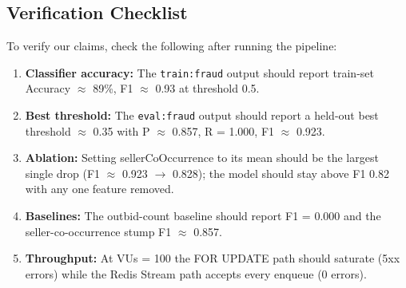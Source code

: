 \documentclass[11pt]{article}
\begin{document}
\subsection{Verification Checklist}

To verify our claims, check the following after running the pipeline:

\begin{enumerate}
    \item \textbf{Classifier accuracy:} The \texttt{train:fraud} output
      should report train-set Accuracy $\approx$ 89\%, F1 $\approx$ 0.93
      at threshold 0.5.
    \item \textbf{Best threshold:} The \texttt{eval:fraud} output should
      report a held-out best threshold $\approx$ 0.35 with P $\approx$
      0.857, R = 1.000, F1 $\approx$ 0.923.
    \item \textbf{Ablation:} Setting sellerCoOccurrence to its mean should
      be the largest single drop (F1 $\approx$ 0.923 $\to$ 0.828); the
      model should stay above F1 0.82 with any one feature removed.
    \item \textbf{Baselines:} The outbid-count baseline should report
      F1 = 0.000 and the seller-co-occurrence stump F1 $\approx$ 0.857.
    \item \textbf{Throughput:} At VUs = 100 the FOR UPDATE path should
      saturate (5xx errors) while the Redis Stream path accepts every
      enqueue (0 errors).
\end{enumerate}
\end{document}

